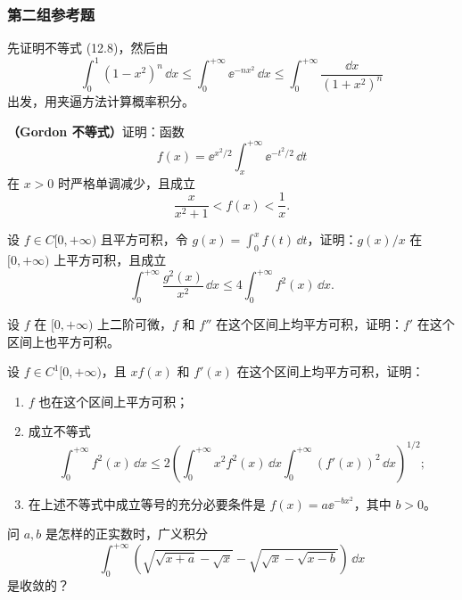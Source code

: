 \subsubsection*{第二组参考题}

\begin{xreferenceproblem}[1]
先证明不等式 (12.8)，然后由
  \[
    \int_0^1(1-x^2)^n\,\dd x
    \leq\int_0^{+\infty}\ee^{-nx^2}\,\dd x
    \leq\int_0^{+\infty}\frac{\dd x}{(1+x^2)^n}
  \]
  出发，用夹逼方法计算概率积分。
\end{xreferenceproblem}

\begin{xreferenceproblem}[2]
\textbf{（Gordon 不等式）}\quad 证明：函数
  \[
    f(x)=\ee^{x^2/2}\int_x^{+\infty}\ee^{-t^2/2}\,\dd t
  \]
  在 $x>0$ 时严格单调减少，且成立
  \[
    \frac{x}{x^2+1}<f(x)<\frac1x.
  \]
\end{xreferenceproblem}

\begin{xreferenceproblem}[3]
设 $f\in C[0,+\infty)$ 且平方可积，令 $g(x)=\int_0^x f(t)\,\dd t$，证明：$g(x)/x$ 在 $[0,+\infty)$ 上平方可积，且成立
  \[
    \int_0^{+\infty}\frac{g^2(x)}{x^2}\,\dd x\leq4\int_0^{+\infty}f^2(x)\,\dd x.
  \]
\end{xreferenceproblem}

\begin{xreferenceproblem}[4]
设 $f$ 在 $[0,+\infty)$ 上二阶可微，$f$ 和 $f''$ 在这个区间上均平方可积，证明：$f'$ 在这个区间上也平方可积。
\end{xreferenceproblem}

\begin{xreferenceproblem}[5]
设 $f\in C^1[0,+\infty)$，且 $xf(x)$ 和 $f'(x)$ 在这个区间上均平方可积，证明：
  \begin{enumerate}[label=(\arabic*)]
    \item $f$ 也在这个区间上平方可积；
    \item 成立不等式
    \[
      \int_0^{+\infty}f^2(x)\,\dd x
      \leq2\left(\int_0^{+\infty}x^2f^2(x)\,\dd x\int_0^{+\infty}(f'(x))^2\,\dd x\right)^{1/2};
    \]
    \item 在上述不等式中成立等号的充分必要条件是 $f(x)=a\ee^{-bx^2}$，其中 $b>0$。
  \end{enumerate}
\end{xreferenceproblem}

\begin{xreferenceproblem}[6]
问 $a,b$ 是怎样的正实数时，广义积分
  \[
    \int_0^{+\infty}\left(\sqrt{\sqrt{x+a}-\sqrt{x}}-\sqrt{\sqrt{x}-\sqrt{x-b}}\right)\,\dd x
  \]
  是收敛的？
\end{xreferenceproblem}

